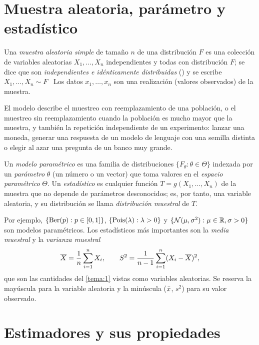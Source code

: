 \section{Muestra aleatoria, parámetro y estadístico}

\begin{definicion}\label{def:t2-mas}
Una \emph{muestra aleatoria simple} de tamaño $n$ de una distribución $F$ es una colección de variables aleatorias $X_1,\dots,X_n$ independientes y todas con distribución $F$; se dice que son \emph{independientes e idénticamente distribuidas} (\iid) y se escribe $X_1,\dots,X_n\sim F$ \iid\ Los datos $x_1,\dots,x_n$ son una realización (valores observados) de la muestra.
\end{definicion}

El modelo describe el muestreo con reemplazamiento de una población, o el muestreo sin reemplazamiento cuando la población es mucho mayor que la muestra, y también la repetición independiente de un experimento: lanzar una moneda, generar una respuesta de un modelo de lenguaje con una semilla distinta o elegir al azar una pregunta de un banco muy grande.

\begin{definicion}\label{def:t2-parametro}
Un \emph{modelo paramétrico} es una familia de distribuciones $\{F_\theta:\theta\in\Theta\}$ indexada por un \emph{parámetro} $\theta$ (un número o un vector) que toma valores en el \emph{espacio paramétrico} $\Theta$. Un \emph{estadístico} es cualquier función $T=g(X_1,\dots,X_n)$ de la muestra que no depende de parámetros desconocidos; es, por tanto, una variable aleatoria, y su distribución se llama \emph{distribución muestral} de $T$.
\end{definicion}

Por ejemplo, $\{\operatorname{Ber}(p):p\in[0,1]\}$, $\{\operatorname{Pois}(\lambda):\lambda>0\}$ y $\{\mathcal{N}(\mu,\sigma^{2}):\mu\in\mathbb{R},\sigma>0\}$ son modelos paramétricos. Los estadísticos más importantes son la \emph{media muestral} y la \emph{varianza muestral}
\[
\overline{X}=\frac1n\sum_{i=1}^{n}X_i,\qquad S^{2}=\frac{1}{n-1}\sum_{i=1}^{n}(X_i-\overline{X})^{2},
\]
que son las cantidades del \cref{tema:1} vistas como variables aleatorias. Se reserva la mayúscula para la variable aleatoria y la minúscula ($\bar{x}$, $s^{2}$) para su valor observado.

\section{Estimadores y sus propiedades}


